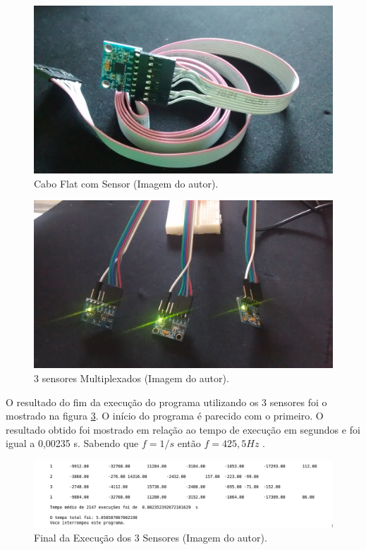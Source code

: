 			\begin{figure}[h!]
			\centering
			\includegraphics[keepaspectratio=true,scale=0.075]{figuras/cabo_mpu.jpg}
			\caption{Cabo Flat com Sensor (Imagem do autor).}
		
			\label{cabo}	
		\end{figure}
		
		\begin{figure}[h!]
		\centering
		\includegraphics[keepaspectratio=true,scale=0.075]{figuras/multiplexados.jpg}
		\caption{3 sensores Multiplexados (Imagem do autor).}
		
		\label{mult}	
	\end{figure}
	
	O resultado do fim da execução do programa utilizando os 3 sensores foi o mostrado na figura \ref{exec3}. O início do programa é parecido com o primeiro. O resultado obtido foi mostrado em relação ao tempo de execução em segundos e foi igual a 0,00235 s. Sabendo que $f = 1/s$ então $ f = 425,5 Hz $ .
	
	\begin{figure}[h!]
		\centering
		\includegraphics[keepaspectratio=true,scale=0.6]{figuras/execut_3s.png}
		\caption{Final da Execução dos 3 Sensores (Imagem do autor).}
		
		\label{exec3}	
	\end{figure}
	
